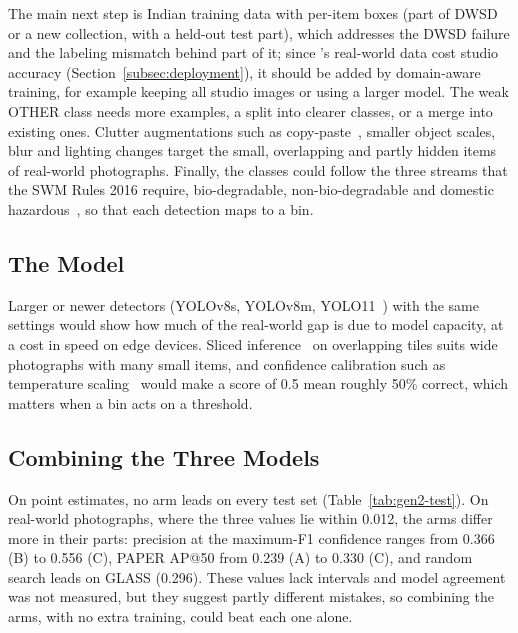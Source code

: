 The main next step is Indian training data with per-item boxes (part of DWSD or a new collection, with a held-out test part), which addresses the DWSD failure and the labeling mismatch behind part of it; since \gentwo's real-world data cost studio accuracy (Section~\ref{subsec:deployment}), it should be added by domain-aware training, for example keeping all studio images or using a larger model. The weak OTHER class needs more examples, a split into clearer classes, or a merge into existing ones. Clutter augmentations such as copy-paste~\cite{ghiasi2021simple}, smaller object scales, blur and lighting changes target the small, overlapping and partly hidden items of real-world photographs. Finally, the classes could follow the three streams that the SWM Rules 2016 require, bio-degradable, non-bio-degradable and domestic hazardous~\cite{moefcc2016solid}, so that each detection maps to a bin.

\subsection{The Model}
\label{subsec:fw-model}

Larger or newer detectors (YOLOv8s, YOLOv8m, YOLO11~\cite{jocher2024yolo11}) with the same settings would show how much of the real-world gap is due to model capacity, at a cost in speed on edge devices. Sliced inference~\cite{akyon2022slicing} on overlapping tiles suits wide photographs with many small items, and confidence calibration such as temperature scaling~\cite{guo2017calibration} would make a score of 0.5 mean roughly 50\% correct, which matters when a bin acts on a threshold.

\subsection{Combining the Three Models}
\label{subsec:fw-ensemble}

On point estimates, no arm leads on every \gentwo test set (Table~\ref{tab:gen2-test}). On real-world photographs, where the three \mapfifty values lie within 0.012, the arms differ more in their parts: precision at the maximum-F1 confidence ranges from 0.366 (B) to 0.556 (C), PAPER AP@50 from 0.239 (A) to 0.330 (C), and random search leads on GLASS (0.296). These values lack intervals and model agreement was not measured, but they suggest partly different mistakes, so combining the arms, with no extra training, could beat each one alone.

